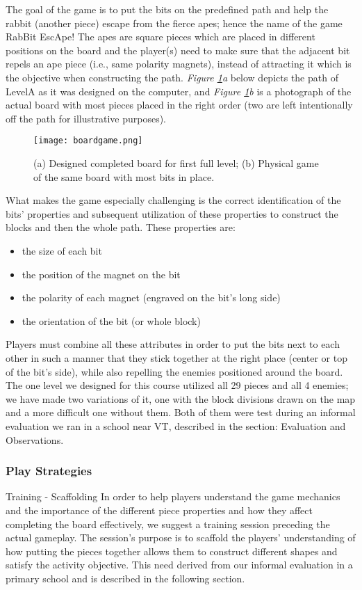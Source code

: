 \documentclass{acm_proc_article-sp}
\begin{document}
The goal of the game is to put the bits on the predefined path and help the rabbit (another piece) escape from the fierce apes; hence the name of the game RabBit EscApe! The apes are square pieces which are placed in different positions on the board and the player(s) need to make sure that the adjacent bit repels an ape piece (i.e., same polarity magnets), instead of attracting it which is the objective when constructing the path. {\em Figure \ref{fig:board-game}a} below depicts the path of LevelA as it was designed on the computer, and {\em Figure \ref{fig:board-game}b} is a photograph of the actual board with most pieces placed in the right order (two are left intentionally off the path for illustrative purposes).
\begin{figure}
  \texttt{[image: boardgame.png]}
  \caption{ (a) Designed completed board for first full level; (b) Physical game of the same board with most bits in place. }
  \label{fig:board-game}
\end{figure}

What makes the game especially challenging is the correct identification of the bits' properties and subsequent utilization of these properties to construct the blocks and then the whole path. These properties are:
\begin{itemize}
  \item{the size of each bit}
  \item{the position of the magnet on the bit}
  \item{the polarity of each magnet (engraved on the bit's long side)}
  \item{the orientation of the bit (or whole block)}
\end{itemize}

Players must combine all these attributes in order to put the bits next to each other in such a manner that they stick together at the right place (center or top of the bit's side), while also repelling the enemies positioned around the board. The one level we designed for this course utilized all 29 pieces and all 4 enemies; we have made two variations of it, one with the block divisions drawn on the map and a more difficult one without them. Both of them were test during an informal evaluation we ran in a school near VT, described in the section: Evaluation and Observations.

\subsubsection{Play Strategies}
Training - Scaffolding
In order to help players understand the game mechanics and the importance of the different piece properties and how they affect completing the board effectively, we suggest a training session preceding the actual gameplay. The session's purpose is to scaffold the players' understanding of how putting the pieces together allows them to construct different shapes and satisfy the activity objective. This need derived from our informal evaluation in a primary school and is described in the following section.
\end{document}
